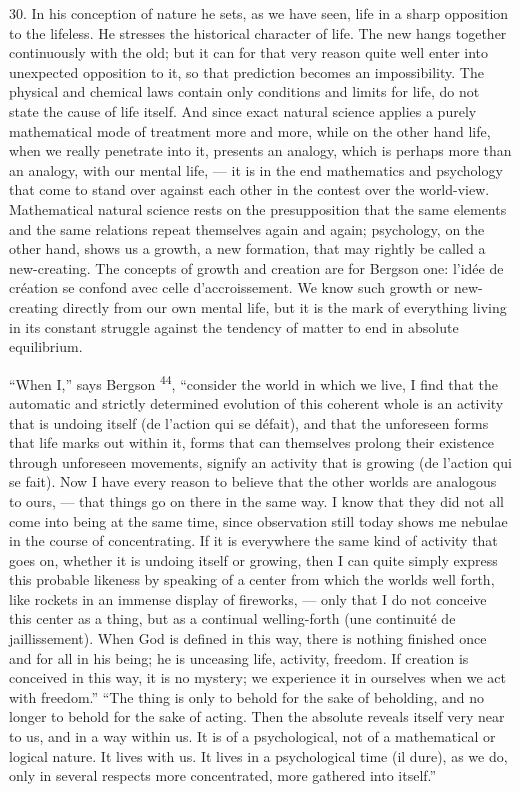 \documentclass[12pt,a4paper,openany]{book}
\newcommand{\opage}[1]{\marginnote{\footnotesize\textit{[#1]}}}
\newcommand{\nm}[1]{\unskip\textsuperscript{#1}}
\begin{document}
30. In his conception of nature he sets, as we have seen, life in a sharp opposition to the lifeless. He stresses the historical character of life. The new hangs together continuously with the old; but it can for that very reason quite well enter into unexpected opposition to it, so that prediction becomes an impossibility. The physical and chemical laws contain only conditions and limits for life, do not state the cause of life itself. And since exact natural science applies a purely mathematical mode of treatment more and more, while on the other hand life, when we really penetrate into it, presents an analogy, which is perhaps more than an analogy, with our mental life, --- it is in the end mathematics and psychology that come to stand over against each other in the contest over the world-view. Mathematical natural science rests on the presupposition that the same elements and the same relations repeat themselves again and again; psychology, on the other hand, shows us a growth, a new formation, that may rightly be called a new-creating. The concepts of growth and creation are for Bergson one: l'idée de création se confond avec celle d'accroissement. We know such growth or new-creating directly from our own mental life, but it is the mark of everything living in its constant struggle against the tendency of matter to end in absolute equilibrium.

``When I,'' says Bergson \nm{44}, ``consider the world in which we live, I find that the automatic and strictly determined evolution of this coherent whole is an activity that is undoing itself (de l'action qui se défait), and that the unforeseen forms that life marks out within it, forms that can themselves prolong their existence through unforeseen movements, signify an activity that is growing (de l'action qui se fait). Now I have every reason to believe that the other worlds are analogous to ours, --- that things go on there in the same way. I know that they did not all come into being at the same time, since observation still today shows me nebulae in the course of concentrating. If it is everywhere the same kind of activity that goes on, whether it is undoing itself or growing, then I can quite
\opage{56}simply express this probable likeness by speaking of a center from which the worlds well forth, like rockets in an immense display of fireworks, --- only that I do not conceive this center as a thing, but as a continual welling-forth (une continuité de jaillissement). When God is defined in this way, there is nothing finished once and for all in his being; he is unceasing life, activity, freedom. If creation is conceived in this way, it is no mystery; we experience it in ourselves when we act with freedom.'' ``The thing is only to behold for the sake of beholding, and no longer to behold for the sake of acting. Then the absolute reveals itself very near to us, and in a way within us. It is of a psychological, not of a mathematical or logical nature. It lives with us. It lives in a psychological time (il dure), as we do, only in several respects more concentrated, more gathered into itself.''
\end{document}
